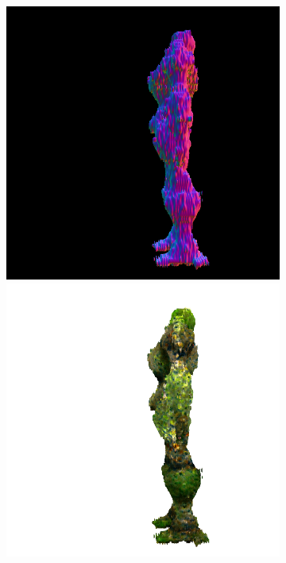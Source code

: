 \begin{figure}[ht]
\begin{subfigure}[b]{0.222\textwidth}
        \includegraphics[width=\textwidth]{figures/appendix/magic123_refine_robot_left_0_part2.png}
        \includegraphics[width=\textwidth]{figures/appendix/magic123_refine_robot_left_0_part1.png}

\end{subfigure}
\end{figure}

